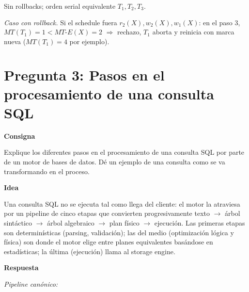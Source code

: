 \documentclass[11pt,a4paper]{article}
\newcommand{\itemcabecera}[1]{\noindent\textbf{#1}\par\medskip}
\newcommand{\bloqueConsigna}{\itemcabecera{Consigna}}
\newcommand{\bloqueIdea}{\itemcabecera{Idea}}
\newcommand{\bloqueRespuesta}{\itemcabecera{Respuesta}}
\begin{document}
Sin rollbacks; orden serial equivalente $T_1, T_2, T_3$.

\textit{Caso con rollback.} Si el schedule fuera $r_2(X), w_2(X), w_1(X)$: en el paso 3, $MT(T_1) = 1 < MT\text{-}E(X) = 2$ $\Rightarrow$ rechazo, $T_1$ aborta y reinicia con marca nueva ($MT(T_1) = 4$ por ejemplo).

\section{Pregunta 3: Pasos en el procesamiento de una consulta SQL}

\bloqueConsigna

Explique los diferentes pasos en el procesamiento de una consulta SQL por parte de un motor de bases de datos. Dé un ejemplo de una consulta como se va transformando en el proceso.

\bloqueIdea

Una consulta SQL no se ejecuta tal como llega del cliente: el motor la atraviesa por un pipeline de cinco etapas que convierten progresivamente texto $\to$ árbol sintáctico $\to$ árbol algebraico $\to$ plan físico $\to$ ejecución. Las primeras etapas son determinísticas (parsing, validación); las del medio (optimización lógica y física) son donde el motor elige entre planes equivalentes basándose en estadísticas; la última (ejecución) llama al storage engine.

\bloqueRespuesta

\textit{Pipeline canónico:}
\end{document}
